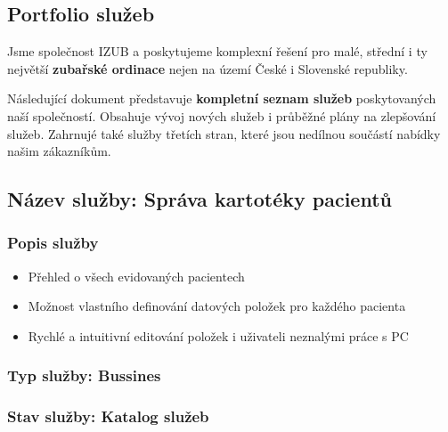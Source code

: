 \documentclass[11pt, a4paper, titlepage]{article}
\begin{document}
	
	\pagestyle{fancy}

	\begin{center}
		\section*{Portfolio služeb}
	\end{center}

	\noindent Jsme společnost IZUB a poskytujeme komplexní řešení pro malé, střední i ty největší \textbf{zubařské ordinace} nejen na území České i Slovenské republiky.

	\noindent Následující dokument představuje \textbf{kompletní seznam služeb} poskytovaných naší společností. Obsahuje vývoj nových služeb i průběžné plány na zlepšování služeb. Zahrnujé také služby třetích stran, které jsou nedílnou součástí nabídky našim zákazníkům. 

	\subsection*{Název služby: Správa kartotéky pacientů}

	\subsubsection*{Popis služby}
	\begin{itemize}
		\item Přehled o všech evidovaných pacientech
		\item Možnost vlastního definování datových položek pro každého pacienta
		\item Rychlé a intuitivní editování položek i uživateli neznalými práce s PC
	\end{itemize}

	\subsubsection*{Typ služby: Bussines}

	\subsubsection*{Stav služby: Katalog služeb}
\end{document}
